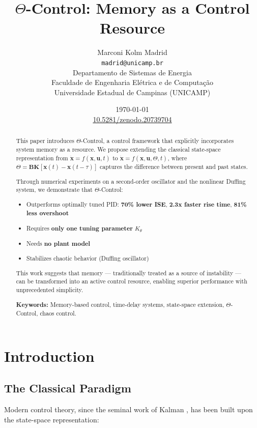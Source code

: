 \documentclass[12pt,a4paper]{article}
\title{$\Theta$-Control: Memory as a Control Resource}
\author{
\parbox{0.9\textwidth}{
\centering
Marconi Kolm Madrid\\
\texttt{madrid@unicamp.br}\\
[0.5em]
Departamento de Sistemas de Energia\\
Faculdade de Engenharia Elétrica e de Computação\\
Universidade Estadual de Campinas (UNICAMP)
}
}
\date{\today\\[2mm] \href{https://doi.org/10.5281/zenodo.20739704}{10.5281/zenodo.20739704}}
\begin{document}
\maketitle

\begin{abstract}
This paper introduces $\Theta$-Control, a control framework that 
explicitly incorporates system memory as a resource. We propose 
extending the classical state-space representation from 
$\dot{\mathbf{x}} = f(\mathbf{x},\mathbf{u},t)$ to 
$\dot{\mathbf{x}} = f(\mathbf{x},\mathbf{u},\Theta,t)$, where 
$\Theta = \mathbf{BK}[\mathbf{x}(t) - \mathbf{x}(t-\tau)]$ captures 
the difference between present and past states.

Through numerical experiments on a second-order oscillator and the 
nonlinear Duffing system, we demonstrate that $\Theta$-Control:

\begin{itemize}
    \item Outperforms optimally tuned PID: \textbf{70\% lower ISE}, 
          \textbf{2.3x faster rise time}, \textbf{81\% less overshoot}
    \item Requires \textbf{only one tuning parameter} $K_\theta$
    \item Needs \textbf{no plant model}
    \item Stabilizes chaotic behavior (Duffing oscillator)
\end{itemize}

This work suggests that memory — traditionally treated as a 
source of instability — can be transformed into an active 
control resource, enabling superior performance with 
unprecedented simplicity.

\noindent\textbf{Keywords:} Memory-based control, time-delay 
systems, state-space extension, $\Theta$-Control, chaos control.
\end{abstract}

\section{Introduction}

\subsection{The Classical Paradigm}

Modern control theory, since the seminal work of Kalman 
\citep{Kalman1960}, has been built upon the state-space 
representation:
\end{document}
